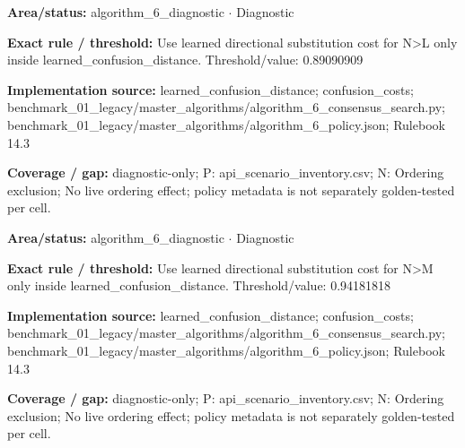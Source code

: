 \begin{tcolorbox}[enhanced,breakable,colback=white,colframe=Muted!45,boxrule=0.45pt,arc=1.5pt,left=6pt,right=6pt,top=5pt,bottom=5pt,title={\texttt{A6-LEARNED-SUBSTITUTION-N-L}},title after break={\texttt{A6-LEARNED-SUBSTITUTION-N-L}\ (continued)},fonttitle=\headingfont\bfseries\color{Navy},coltitle=Navy]
\textbf{Area/status:} algorithm\_\allowbreak{}6\_\allowbreak{}diagnostic $\boldsymbol{\cdot}$ Diagnostic\par
\smallskip
\textbf{Exact rule / threshold:} Use learned directional substitution cost for N>L only inside learned\_\allowbreak{}confusion\_\allowbreak{}distance. Threshold/\allowbreak{}value: 0.89090909\par
\smallskip
\textbf{Implementation source:} learned\_\allowbreak{}confusion\_\allowbreak{}distance; confusion\_\allowbreak{}costs; benchmark\_\allowbreak{}01\_\allowbreak{}legacy/\allowbreak{}master\_\allowbreak{}algorithms/\allowbreak{}algorithm\_\allowbreak{}6\_\allowbreak{}consensus\_\allowbreak{}search.py; benchmark\_\allowbreak{}01\_\allowbreak{}legacy/\allowbreak{}master\_\allowbreak{}algorithms/\allowbreak{}algorithm\_\allowbreak{}6\_\allowbreak{}policy.json; Rulebook 14.3\par
\smallskip
\textbf{Coverage / gap:} diagnostic-only; P: api\_\allowbreak{}scenario\_\allowbreak{}inventory.csv; N: Ordering exclusion; No live ordering effect; policy metadata is not separately golden-tested per cell.
\end{tcolorbox}
\begin{tcolorbox}[enhanced,breakable,colback=white,colframe=Muted!45,boxrule=0.45pt,arc=1.5pt,left=6pt,right=6pt,top=5pt,bottom=5pt,title={\texttt{A6-LEARNED-SUBSTITUTION-N-M}},title after break={\texttt{A6-LEARNED-SUBSTITUTION-N-M}\ (continued)},fonttitle=\headingfont\bfseries\color{Navy},coltitle=Navy]
\textbf{Area/status:} algorithm\_\allowbreak{}6\_\allowbreak{}diagnostic $\boldsymbol{\cdot}$ Diagnostic\par
\smallskip
\textbf{Exact rule / threshold:} Use learned directional substitution cost for N>M only inside learned\_\allowbreak{}confusion\_\allowbreak{}distance. Threshold/\allowbreak{}value: 0.94181818\par
\smallskip
\textbf{Implementation source:} learned\_\allowbreak{}confusion\_\allowbreak{}distance; confusion\_\allowbreak{}costs; benchmark\_\allowbreak{}01\_\allowbreak{}legacy/\allowbreak{}master\_\allowbreak{}algorithms/\allowbreak{}algorithm\_\allowbreak{}6\_\allowbreak{}consensus\_\allowbreak{}search.py; benchmark\_\allowbreak{}01\_\allowbreak{}legacy/\allowbreak{}master\_\allowbreak{}algorithms/\allowbreak{}algorithm\_\allowbreak{}6\_\allowbreak{}policy.json; Rulebook 14.3\par
\smallskip
\textbf{Coverage / gap:} diagnostic-only; P: api\_\allowbreak{}scenario\_\allowbreak{}inventory.csv; N: Ordering exclusion; No live ordering effect; policy metadata is not separately golden-tested per cell.
\end{tcolorbox}
